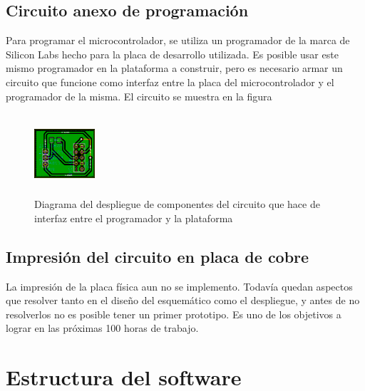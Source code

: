 \documentclass{article}
\theoremstyle{definition}
\theoremstyle{remark}
\begin{document}

\subsection{Circuito anexo de programación} %
\label{sub:circuito_anexo_de_programacion}

Para programar el microcontrolador, se utiliza un programador de la marca de Silicon Labs hecho para la placa de desarrollo utilizada. Es posible usar este mismo programador en la plataforma a construir, pero es necesario armar un circuito que funcione como interfaz entre la placa del microcontrolador y el programador de la misma. El circuito se muestra en la figura

\begin{figure}[h]
  \centering
  \includegraphics[width=0.20\textwidth, height = 3cm]{PCB2}
  \caption{\small Diagrama del despliegue de componentes del circuito que hace de interfaz entre el programador y la plataforma}\label{fig:PCB2}
\end{figure}


\subsection{Impresión del circuito en placa de cobre} %
\label{sub:impresion_del_circuito_en_placa_de_cobre}

La impresión de la placa física aun no se implemento. Todavía quedan aspectos que resolver tanto en el diseño del esquemático como el despliegue, y antes de no resolverlos no es posible tener un primer prototipo. Es uno de los objetivos a lograr en las próximas 100 horas de trabajo.





\section{Estructura del software} %
\label{sec:estructura_del_software}
\end{document}

